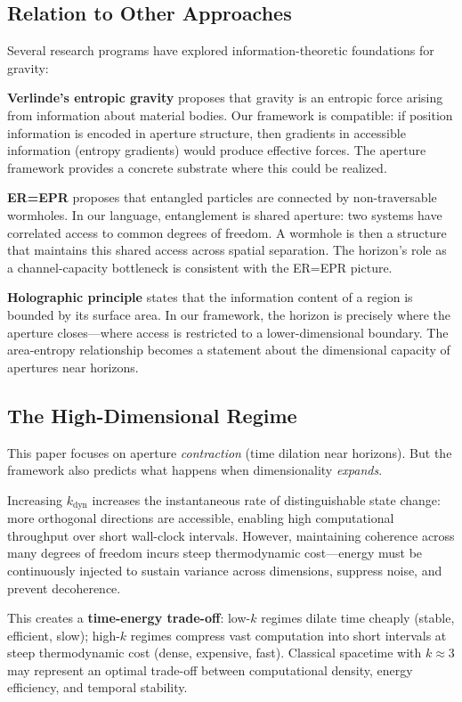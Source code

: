 \documentclass[11pt,a4paper]{article}
\begin{document}
\subsection{Relation to Other Approaches}

Several research programs have explored information-theoretic foundations for gravity:

\textbf{Verlinde's entropic gravity} \cite{verlinde2011} proposes that gravity is an entropic force arising from information about material bodies. Our framework is compatible: if position information is encoded in aperture structure, then gradients in accessible information (entropy gradients) would produce effective forces. The aperture framework provides a concrete substrate where this could be realized.

\textbf{ER=EPR} \cite{maldacena2013} proposes that entangled particles are connected by non-traversable wormholes. In our language, entanglement is shared aperture: two systems have correlated access to common degrees of freedom. A wormhole is then a structure that maintains this shared access across spatial separation. The horizon's role as a channel-capacity bottleneck is consistent with the ER=EPR picture.

\textbf{Holographic principle} \cite{susskind1995} states that the information content of a region is bounded by its surface area. In our framework, the horizon is precisely where the aperture closes---where access is restricted to a lower-dimensional boundary. The area-entropy relationship becomes a statement about the dimensional capacity of apertures near horizons.

\subsection{The High-Dimensional Regime}

This paper focuses on aperture \emph{contraction} (time dilation near horizons). But the framework also predicts what happens when dimensionality \emph{expands}.

Increasing $k_{\mathrm{dyn}}$ increases the instantaneous rate of distinguishable state change: more orthogonal directions are accessible, enabling high computational throughput over short wall-clock intervals. However, maintaining coherence across many degrees of freedom incurs steep thermodynamic cost---energy must be continuously injected to sustain variance across dimensions, suppress noise, and prevent decoherence.

This creates a \textbf{time-energy trade-off}: low-$k$ regimes dilate time cheaply (stable, efficient, slow); high-$k$ regimes compress vast computation into short intervals at steep thermodynamic cost (dense, expensive, fast). Classical spacetime with $k \approx 3$ may represent an optimal trade-off between computational density, energy efficiency, and temporal stability.
\end{document}
